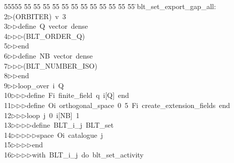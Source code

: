 %
%
\begin{tabbing}
55555 \= 55 \= 55 \= 55 \= 55 \= 55 \= 55 \= 55 \= 55 \= 55 \= 55 \= 55 \= 55 \= \>blt\_set\_export\_gap\_all:\ \\[0pt]
2\>$\triangleright$\>(ORBITER)\ v\ 3\ \\[0pt]
3\>$\triangleright$\>$\triangleright$\>define\ Q\ vector\ dense\ \\[0pt]
4\>$\triangleright$\>$\triangleright$\>$\triangleright$\>(BLT\_ORDER\_Q)\ \\[0pt]
5\>$\triangleright$\>$\triangleright$\>end\ \\[0pt]
6\>$\triangleright$\>$\triangleright$\>define\ NB\ vector\ dense\ \\[0pt]
7\>$\triangleright$\>$\triangleright$\>$\triangleright$\>(BLT\_NUMBER\_ISO)\ \\[0pt]
8\>$\triangleright$\>$\triangleright$\>end\ \\[0pt]
9\>$\triangleright$\>$\triangleright$\>loop\_over\ i\ Q\ \\[0pt]
10\>$\triangleright$\>$\triangleright$\>$\triangleright$\>define\ Fi\ finite\_field\ q\ i[Q]\ end\ \\[0pt]
11\>$\triangleright$\>$\triangleright$\>$\triangleright$\>define\ Oi\ orthogonal\_space\ 0\ 5\ Fi\ create\_extension\_fields\ end\ \\[0pt]
12\>$\triangleright$\>$\triangleright$\>$\triangleright$\>loop\ j\ 0\ i[NB]\ 1\ \\[0pt]
13\>$\triangleright$\>$\triangleright$\>$\triangleright$\>$\triangleright$\>define\ BLT\_i\_j\ BLT\_set\ \\[0pt]
14\>$\triangleright$\>$\triangleright$\>$\triangleright$\>$\triangleright$\>$\triangleright$\>space\ Oi\ catalogue\ j\ \\[0pt]
15\>$\triangleright$\>$\triangleright$\>$\triangleright$\>$\triangleright$\>end\ \\[0pt]
16\>$\triangleright$\>$\triangleright$\>$\triangleright$\>$\triangleright$\>with\ BLT\_i\_j\ do\ blt\_set\_activity\ \\[0pt]

\end{tabbing}
